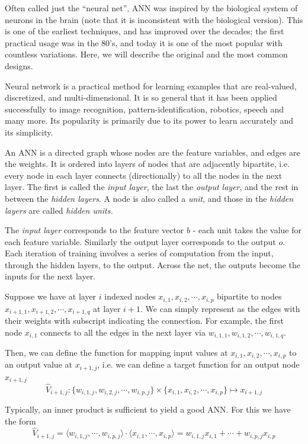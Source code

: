 \documentclass[12pt]{article}  %
\begin{document}
Often called just the ``neural net'', ANN was inspired by the biological system of neurons in the brain (note that it is inconsistent with the biological version). This is one of the earliest techniques, and has improved over the decades; the first practical usage was in the 80's, and today it is one of the most popular with countless variations. Here, we will describe the original and the most common designs.

Neural network is a practical method for learning examples that are real-valued, discretized, and multi-dimensional. It is so general that it has been applied successfully to image recognition, pattern-identification, robotics, speech and many more. Its popularity is primarily due to its power to learn accurately and its simplicity.

An ANN is a directed graph whose nodes are the feature variables, and edges are the weights. It is ordered into layers of nodes that are adjacently bipartite, i.e. every node in each layer connects (directionally) to all the nodes in the next layer. The first is called the {\em input layer}, the last the {\em output layer}, and the rest in between the {\em hidden layers}. A node is also called a {\em unit}, and those in the {\em hidden layers} are called {\em hidden units.}

The {\em input layer} corresponds to the feature vector $b$ - each unit takes the value for each feature variable. Similarly the output layer corresponds to the output $o$. Each iteration of training involves a series of computation from the input, through the hidden layers, to the output. Across the net, the outputs become the inputs for the next layer.

Suppose we have at layer $i$ indexed nodes $x_{i,1}, x_{i,2}, \cdots, x_{i,p}$ bipartite to nodes $x_{i+1,1}, x_{i+1,2}, \cdots, x_{i+1,q}$ at layer $i+1$. We can simply represent as the edges with their weights with subscript indicating the connection. For example, the first node $x_{i,1}$ connects to all the edges in the next layer via $w_{i,1,1}, w_{i,1,2}, \cdots, w_{i,1,q}$.

Then, we can define the function for mapping input values at $x_{i,1}, x_{i,2}, \cdots, x_{i,p}$ to an output value at $x_{i+1,j}$, i.e. we can define a target function for an output node $x_{i+1,j}$ $$\hat{V}_{i+1,j} : \{ w_{i,1,j}, w_{i,2,j}, \cdots, w_{i,p,j} \} \times \{ x_{i,1}, x_{i,2}, \cdots, x_{i,p} \} \mapsto x_{i+1,j}$$

Typically, an inner product is sufficient to yield a good ANN. For this we have the form $$\hat{V}_{i+1,j} = \langle  w_{i,1,j}, \cdots, w_{i,p,j}  \rangle \cdot \langle  x_{i,1}, \cdots, x_{i,p}  \rangle = w_{i,1,j}x_{i,1} + \cdots + w_{i,p,j}x_{i,p}$$
\end{document}

